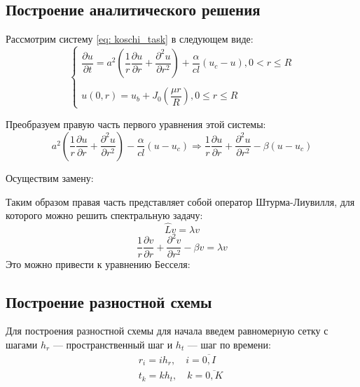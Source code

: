 \documentclass[a4paper,14pt,russian, leqno, fleqn]{extreport}
\begin{document}
	\subsection{Построение аналитического решения}
	Рассмотрим систему \eqref{eq: koschi_task} в следующем виде:
	\begin{equation}
		\left \{\begin{array}{l}
		\dfrac{\partial u}{\partial t} = a^2 \left ( \dfrac{1}{r}\dfrac{\partial u}{\partial r} + \dfrac{\partial^2 u}{\partial r^2}\right ) + \dfrac{\alpha}{cl}(u_c - u), 0 < r \leq R\\
		\\
		u(0, r) = u_b + J_0\left(\dfrac{\mu r}{R}\right), 0 \leq r \leq R
		\end{array}\right.
	\end{equation}
	
	Преобразуем правую часть первого уравнения этой системы:
	\begin{equation}
		a^2 \left ( \dfrac{1}{r}\dfrac{\partial u}{\partial r} + \dfrac{\partial^2 u}{\partial r^2}\right ) - \dfrac{\alpha}{cl}(u - u_c) \Rightarrow \dfrac{1}{r}\dfrac{\partial u}{\partial r} + \dfrac{\partial^2 u}{\partial r^2} - \beta (u - u_c)
	\end{equation}	
	
	Осуществим замену:
	
	Таким образом правая часть представляет собой оператор Штурма-Лиувилля, для которого можно решить спектральную задачу:
	\begin{equation}
		\hat{L}v = \lambda v
	\end{equation}
	\begin{equation}
		\dfrac{1}{r}\dfrac{\partial v}{\partial r} + \dfrac{\partial^2 v}{\partial r^2} - \beta v = \lambda v
	\end{equation}
	Это можно привести к уравнению Бесселя:
	
	\subsection{Построение разностной схемы}
	
	Для построения разностной схемы для начала введем равномерную сетку с шагами $h_r$ --- пространственный шаг и $h_t$ --- шаг по времени:	
	\begin{equation}
	\begin{array}{l}
	r_i = ih_r, \quad i = \overline{0,I} \quad \\                         
	t_k = kh_t, \quad k = \overline{0,K}
	\end{array}
	\label{eq:grid}
	\end{equation}
	
\end{document}
